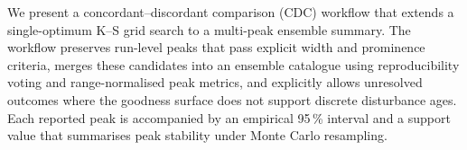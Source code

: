 We present a concordant--discordant comparison (CDC) workflow that extends a single-optimum K--S grid search to a multi-peak ensemble summary. The workflow preserves run-level peaks that pass explicit width and prominence criteria, merges these candidates into an ensemble catalogue using reproducibility voting and range-normalised peak metrics, and explicitly allows unresolved outcomes where the goodness surface does not support discrete disturbance ages. Each reported peak is accompanied by an empirical 95\,\% interval and a support value that summarises peak stability under Monte Carlo resampling.
